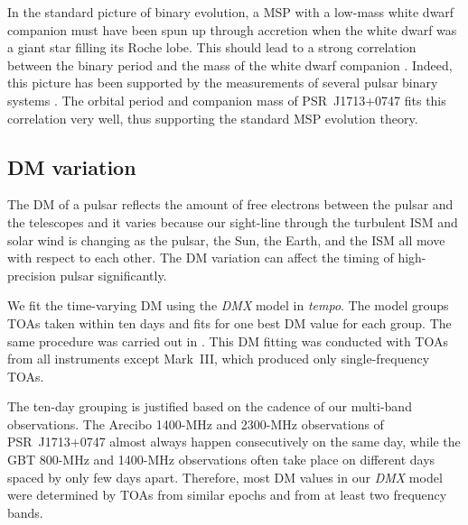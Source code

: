 In the standard picture of binary evolution, a MSP with a low-mass white dwarf companion must have been spun up through accretion when the white dwarf was a giant star filling its Roche lobe. 
This should lead to a strong correlation between the binary period and the mass of the white dwarf companion \citep{rpj+95, ts99a, prp02b}. 
Indeed, this picture has been supported by the measurements of several pulsar
binary systems \citep[e.g.,][]{vbb+01, ktr94, th14}.  
The orbital period and companion mass of PSR~J1713+0747 fits
this correlation very well, thus supporting the standard MSP evolution theory. %




\subsection{DM variation}
\label{sec:dmx}
The DM of a pulsar reflects the amount of free electrons between
the pulsar and the telescopes and it varies because
our sight-line through the turbulent ISM and solar wind is changing as the
pulsar, the Sun, the Earth, and the ISM all move with respect to each other.
The DM variation can affect the timing of high-precision pulsar significantly.

We fit the time-varying DM using the {\it DMX} model in {\it tempo}.
The model groups TOAs taken within ten days and fits for one
best DM value for each group.  The same procedure was carried out in
\citealt{dfg+13}.  This DM fitting was conducted with TOAs from all
instruments except Mark~III, which produced only single-frequency TOAs.

The ten-day grouping is justified based on the cadence of our multi-band
observations.
The Arecibo 1400-MHz and 2300-MHz observations of PSR~J1713+0747 almost
always happen consecutively on
the same day, while the GBT 800-MHz and 1400-MHz observations often take place on different
days spaced by only few days apart.
Therefore, most DM values in our {\it DMX} model were determined by TOAs from
similar epochs and from at least two frequency bands. 

